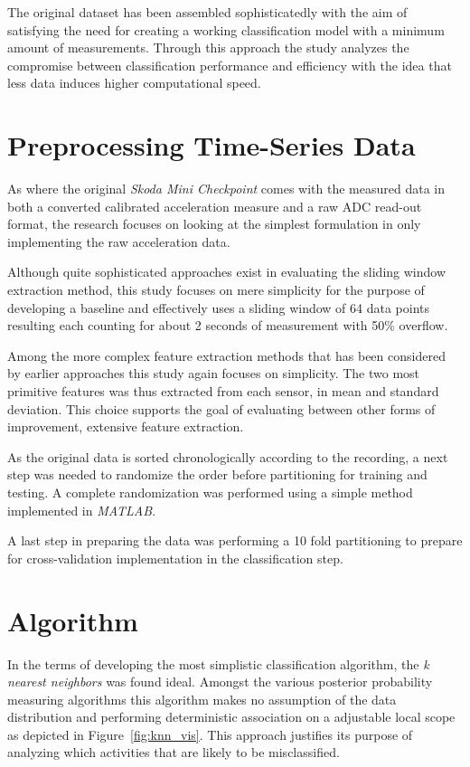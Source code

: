 \documentclass{sig-alternate}
\begin{document}
The original dataset has been assembled sophisticatedly with the aim of satisfying the need for creating a working classification model with a minimum amount of measurements. Through this approach the study analyzes the compromise between classification performance and efficiency with the idea that less data induces higher computational speed.


\section{Preprocessing Time-Series Data}
As where the original \textit{Skoda Mini Checkpoint} comes with the measured data in both a converted calibrated acceleration measure and a raw ADC read-out format, the research focuses on looking at the simplest formulation in only implementing the raw acceleration data.

Although quite sophisticated approaches exist in evaluating the sliding window extraction method, this study focuses on mere simplicity for the purpose of developing a baseline and effectively uses a sliding window of 64 data points resulting each counting for about 2 seconds of measurement with 50\% overflow\cite{Zhang}.

Among the more complex feature extraction methods that has been considered by earlier approaches this study again focuses on simplicity. The two most primitive features was thus extracted from each sensor, in mean and standard deviation. This choice supports the goal of evaluating between other forms of improvement, extensive feature extraction.

As the original data is sorted chronologically according to the recording, a next step was needed to randomize the order before partitioning for training and testing. A complete randomization was performed using a simple method implemented in \textit{MATLAB}.

A last step in preparing the data was performing a 10 fold partitioning to prepare for cross-validation implementation in the classification step.


\section{Algorithm}
In the terms of developing the most simplistic classification algorithm, the \textit{k nearest neighbors} was found ideal. Amongst the various posterior probability measuring algorithms this algorithm makes no assumption of the data distribution and performing deterministic association on a adjustable local scope as depicted in Figure~\ref{fig:knn_vis}. This approach justifies its purpose of analyzing which activities that are likely to be misclassified. 
\end{document}
